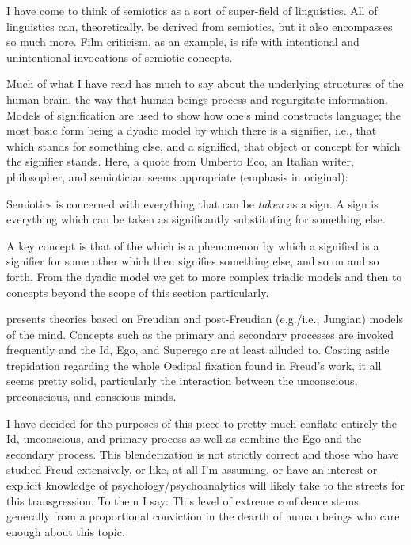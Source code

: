 \documentclass[../butidigress.tex]{subfiles}
\begin{document}
I have come to think of semiotics as a sort of super-field of linguistics.
All of linguistics can, theoretically, be derived from semiotics, but it also encompasses so much more.
Film criticism, as an example, is rife with intentional and unintentional invocations of semiotic concepts.

Much of what I have read has much to say about the underlying structures of the human brain, the way that human beings process and regurgitate information.
Models of signification are used to show how one's mind constructs language; the most basic form being a dyadic model by which there is a signifier, i.e., that which stands for something else, and a signified, that object or concept for which the signifier stands.
Here, a quote from Umberto Eco, an Italian writer, philosopher, and semiotician seems appropriate (emphasis in original):
\begin{displayquote}
Semiotics is concerned with everything that can be \emph{taken} as a sign.
A sign is everything which can be taken as significantly substituting for something else.\autocite{ecosemiotics}
\end{displayquote}

A key concept is that of the  which is a phenomenon by which a signified is a signifier for some other  which then signifies something else, and so on and so forth.
From the dyadic model we get to more complex triadic models and then to concepts beyond the scope of this section particularly.


 presents theories based on Freudian and post-Freudian (e.g./i.e., Jungian) models of the mind.
Concepts such as the primary and secondary processes are invoked frequently and the Id, Ego, and Superego are at least alluded to.
Casting aside trepidation regarding the whole Oedipal fixation found in Freud's work, it all seems pretty solid, particularly the interaction between the unconscious, preconscious, and conscious minds.

I have decided for the purposes of this piece to pretty much conflate entirely the Id, unconscious, and primary process as well as combine the Ego and the secondary process.
This blenderization is not strictly correct and those who have studied Freud extensively, or like, at all I'm assuming, or have an interest or explicit knowledge of psychology/psychoanalytics will likely take to the streets for this transgression.
To them I say: 
This level of extreme confidence stems generally from a proportional conviction in the dearth of human beings who care enough about this topic.
\end{document}
